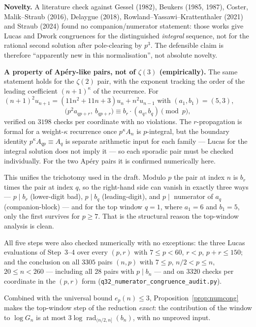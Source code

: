 \medskip
\noindent\textbf{Novelty.}  A literature check against Gessel (1982), Beukers (1985, 1987),
Coster, Malik--Straub (2016), Delaygue (2018), Rowland--Yassawi--Krattenthaler (2021) and
Straub (2024) found no companion/numerator statement: those works give Lucas and Dwork
congruences for the distinguished \emph{integral} sequence, not for the rational second solution
after pole-clearing by $p^3$.  The defensible claim is therefore ``apparently new in this
normalisation'', not absolute novelty.

\medskip
\noindent\textbf{A property of Ap\'ery-like pairs, not of $\zeta(3)$ (empirically).}  The same statement
holds for the $\zeta(2)$ pair, with the exponent tracking the order of the leading coefficient
$(n+1)^\kappa$ of the recurrence.  For
$(n+1)^2u_{n+1}=(11n^2+11n+3)u_n+n^2u_{n-1}$ with $(a_1,b_1)=(5,3)$,
\[
  \bigl(p^2a_{qp+r},\ b_{qp+r}\bigr)\equiv b_r\cdot(a_q,b_q)\pmod p,
\]
verified on $3198$ checks per coordinate with no violations.  The $r$-propagation is formal for
a weight-$\kappa$ recurrence once $p^\kappa A_n$ is $p$-integral, but the boundary identity
$p^\kappa A_{qp}\equiv A_q$ is separate arithmetic input for each family — Lucas for the integral
solution does not imply it — so each sporadic pair must be checked individually.  For the two
Ap\'ery pairs it is confirmed numerically here.

This unifies the trichotomy used in the draft.  Modulo $p$ the pair at index $n$ is $b_r$ times
the pair at index $q$, so the right-hand side can vanish in exactly three ways —
$p\mid b_r$ (lower-digit bad), $p\mid b_q$ (leading-digit), and $p\mid$ numerator of $a_q$
(companion-block) — and for the top window $q=1$, where $a_1=6$ and $b_1=5$, only the first
survives for $p\ge7$.  That is the structural reason the top-window analysis is clean.

All five steps were also checked numerically with no exceptions: the three Lucas evaluations of
Step~3--4 over every $(p,r)$ with $7\le p<60$, $r<p$, $p+r\le150$; and the conclusion on all
$3305$ pairs $(n,p)$ with $7\le p$, $n/2<p\le n$, $20\le n<260$ — including all $28$ pairs with
$p\mid b_n$ — and on $3320$ checks per coordinate in the $(p,r)$ form
(\texttt{q32\_numerator\_congruence\_audit.py}).

Combined with the universal bound $e_p(n)\le3$, Proposition~\ref{prop:numcong} makes the
top-window step of the reduction \emph{exact}: the contribution of the window to $\log G_n$ is
at most $3\log\operatorname{rad}_{(n/2,n]}(b_n)$, with no unproved input.

